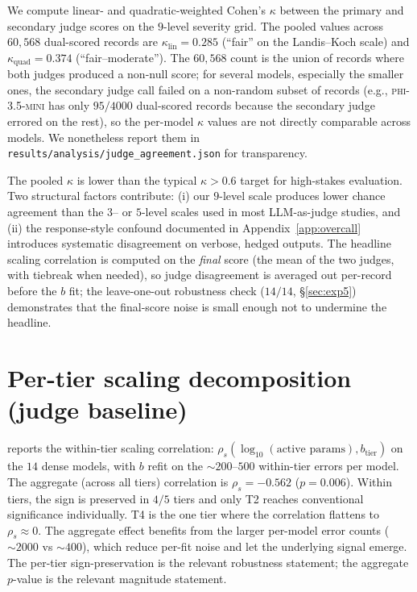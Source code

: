 \documentclass{article}
\newcommand{\sdi}{\ensuremath{b}}
\begin{document}
We compute linear- and quadratic-weighted Cohen's $\kappa$ between
the primary and secondary judge scores on the $9$-level severity
grid. The pooled values across $60{,}568$ dual-scored records are
$\kappa_{\text{lin}} = 0.285$ (``fair'' on the Landis--Koch scale)
and $\kappa_{\text{quad}} = 0.374$ (``fair--moderate''). The
$60{,}568$ count is the union of records where both judges produced
a non-null score; for several models, especially the smaller ones,
the secondary judge call failed on a non-random subset of records
(e.g., \textsc{phi-3.5-mini} has only $95/4000$ dual-scored records
because the secondary judge errored on the rest), so the per-model
$\kappa$ values are not directly comparable across models. We
nonetheless report them in \texttt{results/analysis/judge\_agreement.json}
for transparency.

The pooled $\kappa$ is lower than the typical $\kappa > 0.6$ target
for high-stakes evaluation. Two structural factors contribute:
(i) our $9$-level scale produces lower chance agreement than the
$3$-- or $5$-level scales used in most LLM-as-judge studies, and
(ii) the response-style confound documented in
Appendix~\ref{app:overcall} introduces
systematic disagreement on verbose, hedged outputs. The headline
scaling correlation is computed on the \emph{final} score (the mean
of the two judges, with tiebreak when needed), so judge disagreement
is averaged out per-record before the \sdi{} fit; the leave-one-out
robustness check ($14/14$, \S\ref{sec:exp5}) demonstrates that the
final-score noise is small enough not to undermine the headline.

\section{Per-tier scaling decomposition (judge baseline)}\label{app:per_tier}

 reports the within-tier scaling correlation:
$\rho_s(\log_{10}(\text{active params}), \sdi_{\text{tier}})$
on the $14$ dense models, with $b$ refit on the $\sim 200$--$500$
within-tier errors per model. The aggregate (across all tiers)
correlation is $\rho_s = -0.562$ ($p = 0.006$). Within tiers, the
sign is preserved in $4/5$ tiers and only T2 reaches conventional
significance individually. T4 is the one tier where the correlation
flattens to $\rho_s \approx 0$. The aggregate effect benefits from
the larger per-model error counts ($\sim 2000$ vs $\sim 400$),
which reduce per-fit noise and let the underlying signal emerge.
The per-tier sign-preservation is the relevant robustness
statement; the aggregate $p$-value is the relevant magnitude
statement.
\end{document}
